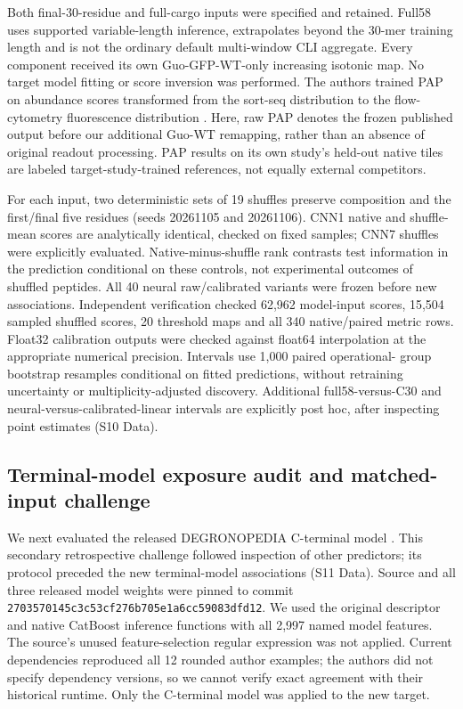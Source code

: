 \documentclass[11pt,a4paper]{article}
\begin{document}
Both final-30-residue and full-cargo inputs were specified and retained.
Full58 uses supported variable-length inference, extrapolates beyond the
30-mer training length and is not the ordinary default multi-window CLI
aggregate. Every component received its own Guo-GFP-WT-only increasing
isotonic map. No target model fitting or score inversion was performed.
The authors trained PAP on abundance scores transformed from the sort-seq
distribution to the flow-cytometry fluorescence distribution \cite{voutsinos}.
Here, raw PAP denotes the frozen published output before our additional
Guo-WT remapping, rather than an absence of original readout processing.
PAP results on its own study's held-out native tiles are labeled
target-study-trained references, not equally external competitors.

For each input, two deterministic sets of 19 shuffles preserve composition
and the first/final five residues (seeds 20261105 and 20261106). CNN1 native
and shuffle-mean scores are analytically identical, checked on fixed
samples; CNN7 shuffles were explicitly evaluated. Native-minus-shuffle
rank contrasts test information in the prediction conditional on these
controls, not experimental outcomes of shuffled peptides. All 40 neural
raw/calibrated variants were frozen before new associations. Independent
verification checked 62,962 model-input scores, 15,504 sampled shuffled
scores, 20 threshold maps and all 340 native/paired metric rows. Float32
calibration outputs were checked against float64 interpolation at the
appropriate numerical precision. Intervals use 1,000 paired operational-
group bootstrap resamples conditional on fitted predictions, without
retraining uncertainty or multiplicity-adjusted discovery. Additional
full58-versus-C30 and neural-versus-calibrated-linear intervals are explicitly
post hoc, after inspecting point estimates (S10 Data).

\subsection{Terminal-model exposure audit and matched-input challenge}
We next evaluated the released DEGRONOPEDIA C-terminal model
\cite{degronopedia}. This secondary retrospective challenge followed inspection
of other predictors; its protocol preceded the new terminal-model associations
(S11 Data). Source and all three released model weights were pinned to commit
\texttt{2703570145c3c53cf276b705e1a6cc59083dfd12}. We used the original
descriptor and native CatBoost inference functions with all 2,997 named model
features. The source's unused feature-selection regular expression was not
applied. Current dependencies reproduced all 12 rounded author examples;
the authors did not specify dependency versions, so we cannot verify exact agreement with their historical runtime. Only the C-terminal model was applied to the new target.
\end{document}
